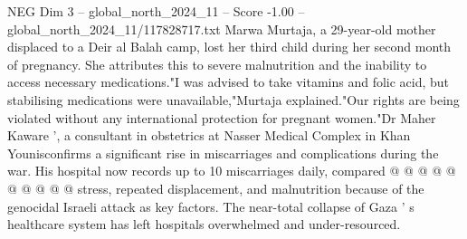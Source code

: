 \begin{textsample}{NEG Dim 3 – global\_north\_2024\_11 – Score -1.00 – global\_north\_2024\_11/117828717.txt}
Marwa Murtaja, a 29-year-old mother displaced to a Deir al Balah camp, lost her third child during her second month of pregnancy.
She attributes this to severe malnutrition and the inability to access necessary medications."I was advised to take vitamins and folic acid, but stabilising medications were unavailable,"Murtaja explained."Our rights are being violated without any international protection for pregnant women."Dr Maher Kaware ', a consultant in obstetrics at Nasser Medical Complex in Khan Younisconfirms a significant rise in miscarriages and complications during the war.
His hospital now records up to 10 miscarriages daily, compared @ @ @ @ @ @ @ @ @ @ stress, repeated displacement, and malnutrition because of the genocidal Israeli attack as key factors.
The near-total collapse of Gaza ' s healthcare system has left hospitals overwhelmed and under-resourced.

\end{textsample}

